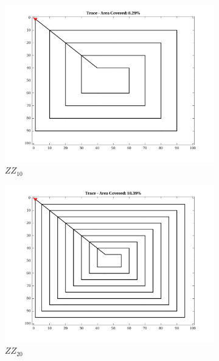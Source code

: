 \begin{figure}[htb!]
\begin{subfigure}[t]{0.25\textwidth}
        \centering
        \includegraphics[width=\linewidth]{figures/path_zz_10p_100x100_sf_25_seed_1.png}
        \captionsetup{skip=0.20\baselineskip,size=footnotesize}
        \caption{$ZZ_{10}$}
    \end{subfigure}%
    \begin{subfigure}[t]{0.25\textwidth}
        \centering
        \includegraphics[width=\linewidth]{figures/path_zz_20p_100x100_sf_25_seed_1.png}
        \captionsetup{skip=0.20\baselineskip,size=footnotesize}
        \caption{$ZZ_{20}$}
    \end{subfigure}%
    \begin{subfigure}[t]{0.25\textwidth}
        \centering

\end{subfigure}
\end{figure}
